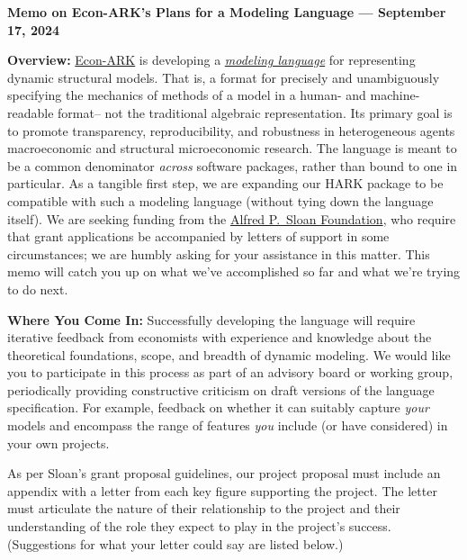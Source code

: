 \documentclass[12pt,pdftex,letterpaper]{article}
\begin{document}
\begin{center}
	\textbf{Memo on Econ-ARK's Plans for a Modeling Language --- September 17, 2024}
\end{center}


\noindent \textbf{Overview:} \href{https://econ-ark.org/}{Econ-ARK} is developing a \href{https://ampl.com/wp-content/uploads/amlopt.pdf}{\textit{modeling language}} for representing dynamic structural models. That is, a format for precisely and unambiguously specifying the mechanics of methods of a model in a human- and machine-readable format-- not the traditional algebraic representation. Its primary goal is to promote transparency, reproducibility, and robustness in heterogeneous agents macroeconomic and structural microeconomic research. The language is meant to be a common denominator \textit{across} software packages, rather than bound to one in particular. As a tangible first step, we are expanding our HARK package to be compatible with such a modeling language (without tying down the language itself). We are seeking funding from the \href{https://sloan.org/}{Alfred P.\ Sloan Foundation}, who require that grant applications be accompanied by letters of support in some circumstances; we are humbly asking for your assistance in this matter. This memo will catch you up on what we've accomplished so far and what we're trying to do next.

\vspace{0.5cm}

\noindent \textbf{Where You Come In:} Successfully developing the language will require iterative feedback from economists with experience and knowledge about the theoretical foundations, scope, and breadth of dynamic modeling. We would like you to participate in this process as part of an advisory board or working group, periodically providing constructive criticism on draft versions of the language specification. For example, feedback on whether it can suitably capture \textit{your} models and encompass the range of features \textit{you} include (or have considered) in your own projects.

As per Sloan's grant proposal guidelines, our project proposal must include an appendix with a letter from each key figure supporting the project. The letter must articulate the nature of their relationship to the project and their understanding of the role they expect to play in the project's success. (Suggestions for what your letter could say are listed below.)
\end{document}
